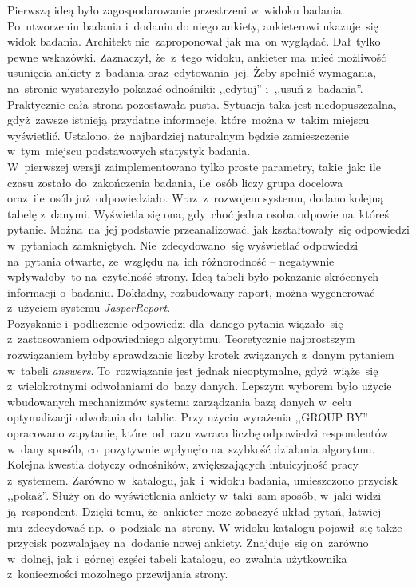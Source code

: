 Pierwszą ideą było zagospodarowanie przestrzeni w~widoku badania. Po~utworzeniu badania i~dodaniu do niego ankiety, ankieterowi ukazuje~się widok badania. Architekt nie~zaproponował jak ma~on wyglądać. Dał~tylko pewne wskazówki. Zaznaczył, że~z~tego widoku, ankieter ma~mieć możliwość usunięcia ankiety z~badania oraz~edytowania~jej. Żeby spełnić wymagania, na~stronie wystarczyło pokazać odnośniki: ,,edytuj'' i~,,usuń z~badania''. Praktycznie cała strona pozostawała pusta. Sytuacja taka jest niedopuszczalna, gdyż~zawsze istnieją przydatne informacje, które~można w~takim miejscu wyświetlić. Ustalono, że~najbardziej naturalnym będzie zamieszczenie w~tym~miejscu podstawowych statystyk badania. \\

W~pierwszej wersji zaimplementowano tylko proste parametry, takie~jak: ile czasu zostało do~zakończenia badania, ile~osób liczy grupa docelowa oraz~ile~osób już~odpowiedziało. Wraz~z~rozwojem systemu, dodano kolejną tabelę z~danymi. Wyświetla się ona, gdy~choć jedna osoba odpowie na~któreś pytanie. Można~na~jej podstawie przeanalizować, jak kształtowały~się odpowiedzi w~pytaniach zamkniętych. Nie~zdecydowano~się wyświetlać odpowiedzi na~pytania otwarte, ze~względu na~ich różnorodność -- negatywnie wpływałoby~to na~czytelność strony. Ideą tabeli było pokazanie skróconych informacji o~badaniu. Dokładny, rozbudowany raport, można wygenerować z~użyciem systemu \textit{JasperReport}. \\

Pozyskanie i~podliczenie odpowiedzi dla~danego pytania wiązało~się z~zastosowaniem odpowiedniego algorytmu. Teoretycznie najprostszym rozwiązaniem byłoby sprawdzanie liczby krotek związanych z~danym pytaniem w~tabeli \textit{answers}. To~rozwiązanie jest jednak nieoptymalne, gdyż~wiąże~się z~wielokrotnymi odwołaniami do~bazy danych. Lepszym wyborem było użycie wbudowanych mechanizmów systemu zarządzania bazą danych w~celu optymalizacji odwołania do~tablic. Przy użyciu wyrażenia ,,GROUP BY'' opracowano zapytanie, które~od~razu zwraca liczbę odpowiedzi respondentów w~dany sposób, co~pozytywnie wpłynęło na~szybkość działania algorytmu. \\

Kolejna kwestia dotyczy odnośników, zwiększających intuicyjność pracy z~systemem. Zarówno w~katalogu, jak~i~widoku badania, umieszczono przycisk ,,pokaż''. Służy on do wyświetlenia ankiety w~taki~sam sposób, w~jaki widzi ją~respondent. Dzięki temu, że~ankieter może zobaczyć układ pytań, łatwiej mu~zdecydować np.~o~podziale na~strony. W widoku katalogu pojawił~się także przycisk pozwalający na~dodanie nowej ankiety. Znajduje~się on~zarówno w~dolnej, jak i~górnej części tabeli katalogu, co~zwalnia użytkownika z~konieczności mozolnego przewijania strony. \\

